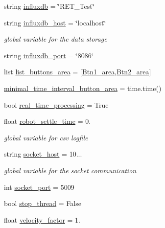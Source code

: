 \begin{DoxyCompactItemize}
string \hyperlink{namespaceRET__config_a6297da7d9cbabcbe91effb0271677ff3}{influxdb} = \char`\"{}R\+E\+T\+\_\+\+Test\char`\"{}
\item 
string \hyperlink{namespaceRET__config_a5ad590543d5ae7b0a89b3681d33928d8}{influxdb\+\_\+host} = \char`\"{}localhost\char`\"{}
\begin{DoxyCompactList}\small\item\em global variable for the data storage \end{DoxyCompactList}\item 
string \hyperlink{namespaceRET__config_a91cab5b28cd6867b74e2cb9f887b2948}{influxdb\+\_\+port} = \char`\"{}8086\char`\"{}
\item 
list \hyperlink{namespaceRET__config_a25b4602337319d65f44337e6ad1b0487}{list\+\_\+buttons\+\_\+area} = \mbox{[}\hyperlink{namespaceRET__config_a118140d2896d1aff1e3c9355f9deb314}{Btn1\+\_\+area},\hyperlink{namespaceRET__config_a51a4083768cbc17b22a98ad63a7bf851}{Btn2\+\_\+area}\mbox{]}
\item 
\hyperlink{namespaceRET__config_a1cc0506097479f304974f44bc5456f4a}{minimal\+\_\+time\+\_\+interval\+\_\+button\+\_\+area} = time.\+time()
\item 
bool \hyperlink{namespaceRET__config_a4132cf21a6c01ecf59141756ab5f9936}{real\+\_\+time\+\_\+processing} = True
\item 
float \hyperlink{namespaceRET__config_aff247d8ee094bb439dbb098e236455cb}{robot\+\_\+settle\+\_\+time} = 0.
\begin{DoxyCompactList}\small\item\em global variable for csv logfile \end{DoxyCompactList}\item 
string \hyperlink{namespaceRET__config_a2014ea8569b3cda02e44e85f8840eba2}{socket\+\_\+host} = \textquotesingle{}10...\textquotesingle{}
\begin{DoxyCompactList}\small\item\em global variable for the socket communication \end{DoxyCompactList}\item 
int \hyperlink{namespaceRET__config_a08c4648fe1aa34a4fd5ad0097d17237f}{socket\+\_\+port} = 5009
\item 
bool \hyperlink{namespaceRET__config_a94d742b756b055a53df310fd15705ede}{stop\+\_\+thread} = False
\item 
float \hyperlink{namespaceRET__config_a0fee7ae942bb4b6078c6400331aef6f1}{velocity\+\_\+factor} = 1.
\item 

\end{DoxyCompactItemize}
